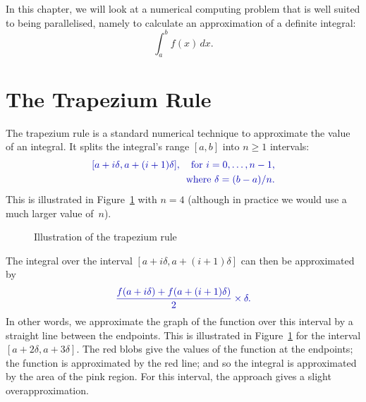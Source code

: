 In this chapter, we will look at a numerical computing problem that is well
suited to being parallelised, namely to calculate an approximation of a definite
integral:
\[
\int_a^b f(x) \, dx .
\]


\section{The Trapezium Rule}

The trapezium rule is a standard numerical technique to
approximate the value of an integral.  It splits the integral's range $[a,b]$
into $n \ge 1$ intervals:
\[\mstyle
\begin{align}
[{a+i\delta}, a+(i+1)\delta], 
  \quad\mbox{for $i = 0, \ldots, n-1$,} \\
\mbox{where $\delta = (b-a)/n$.}
\end{align}
\]
This is illustrated in Figure~\ref{fig:trapezium} with $n = 4$
(although in practice we would use a much larger value of~$n$).


\begin{figure}
\begin{center}
\def\labY{-0.16}
\def\fn{\x^3/240 + \x^2/10 - 0.5*\x + 1.5}   %
\end{center}
\caption{Illustration of the trapezium rule}
\label{fig:trapezium}
\end{figure}


The integral over the interval $[a+i\delta, a+(i+1)\delta]$ can then be
approximated by 
\[\mstyle
\frac{f(a+i\delta)+f(a+(i+1)\delta)}{2} \times \delta.
\]
In other words, we approximate the graph of the function over this interval by
a straight line between the endpoints.  This is illustrated in
Figure~\ref{fig:trapezium} for the interval $[a+2\delta, a+3\delta]$.  The red
blobs give the values of the function at the endpoints; the function is
approximated by the red line; and so the integral is approximated by the area
of the pink region.  For this interval, the approach gives a slight
overapproximation. 

